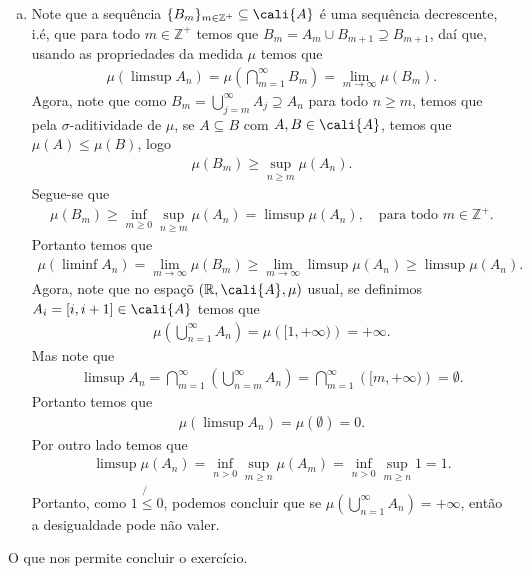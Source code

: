 \begin{homeworkProblem}[6]
\begin{solution}
\begin{enumerate}[a)]
      \item Note que a sequência $\{B_m\}_{m\in\mathbb{Z}^{+}}\subseteq\cali{A}$ é uma sequência decrescente, i.é, que para todo $m\in\mathbb{Z}^{+}$ temos que $B_{m}=A_m\cup B_{m+1}\supseteq B_{m+1}$, daí que, usando as propriedades da medida $\mu$ temos que 
        \begin{align*}
          \mu\left( \limsup A_n \right)=\mu\left(\bigcap_{m=1}^{\infty}B_m \right)=\lim_{m\to\infty}\mu(B_m).
        \end{align*}
        Agora, note que como $B_m=\bigcup_{j=m}^{\infty}A_j\supseteq A_n$ para todo $n\geq m$, temos que pela $\sigma$-aditividade de $\mu$, se $A\subseteq B$ com $A,B\in\cali{A}$, temos que $\mu(A)\leq \mu(B)$, logo 
        \begin{align*}
          \mu(B_m)\geq\sup_{n\geq m}\mu(A_n).
        \end{align*}
        Segue-se que
        \begin{align*}
          \mu(B_m)\geq\inf_{m\geq 0}\sup_{n\geq m}\mu(A_n)=\limsup \mu(A_n),\quad\text{para todo }m\in\mathbb{Z}^{+}.
        \end{align*}
        Portanto temos que
        \begin{align*}
          \mu\left( \liminf A_n \right)=\lim_{m\to\infty}\mu(B_m)\geq\lim_{m\to\infty}\limsup \mu(A_n)\geq\limsup\mu(A_n).
        \end{align*}
        Agora, note que no espaçõ $(\mathbb{R},\cali{A},\mu)$ usual, se definimos $A_i=[i,i+1]\in\cali{A}$ temos que
        \begin{align*}
          \mu\left( \bigcup_{n=1}^{\infty}A_n \right)=\mu\left( [1,+\infty) \right)=+\infty.
        \end{align*}
        Mas note que
        \begin{align*}
          \limsup A_n=\bigcap_{m=1}^{\infty}\left( \bigcup_{n=m}^{\infty}A_n \right)=\bigcap_{m=1}^{\infty}\left( [m,+\infty) \right)=\emptyset.
        \end{align*}
        Portanto temos que
        \begin{align*}
          \mu(\limsup A_n)=\mu(\emptyset)=0.
        \end{align*}
        Por outro lado temos que
        \begin{align*}
          \limsup\mu(A_n)=\inf_{n>0}\sup_{m\geq n}\mu(A_m)=\inf_{n>0}\sup_{m\geq n}1=1.
        \end{align*}
        Portanto, como $1\not{\leq}0$, podemos concluir que se $\mu(\bigcup_{n=1}^{\infty}A_n)=+\infty$, então a desigualdade pode não valer.
    \end{enumerate}
    O que nos permite concluir o exercício.
  \end{solution}
\end{homeworkProblem}

